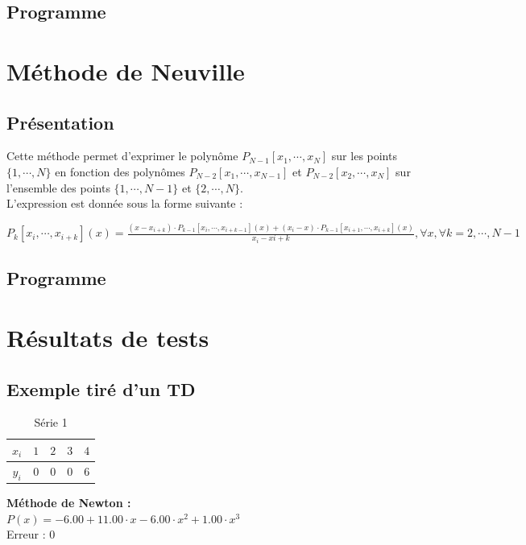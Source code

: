 \documentclass{report}
\begin{document}
      \subsection{Programme}
	
    \newpage
    \section{Méthode de Neuville}
      \subsection{Présentation}
	Cette méthode permet d'exprimer le polynôme $P_{N-1}[x_{1},\cdots,x_{N}]$ sur les points $\{1,\cdots,N\}$ en fonction des polynômes $P_{N-2}[x_{1},\cdots,x_{N-1}]$ et $P_{N-2}[x_{2},\cdots,x_{N}]$ sur l'ensemble des points $\{1,\cdots,N-1\}$ et $\{2,\cdots,N\}$.\\
	
	\noindent L'expression est donnée sous la forme suivante : 
	
	$P_{k}[x_{i},\cdots,x_{i+k}](x) = \frac{(x-x_{i+k}) \cdot P_{k-1}[x_{i},\cdots,x_{i+k-1}](x) + (x_{i}-x) \cdot P_{k-1}[x_{i+1},\cdots,x_{i+k}](x)}{x_{i}-x{i+k}}, \forall x, \forall k=2,\cdots,N-1$ 
      \subsection{Programme}
	
    \newpage
    \section{Résultats de tests}
      \subsection{Exemple tiré d'un TD}
	\begin{table}[h]
	  \centering
	  \begin{tabular}{| c | c | c | c | c |}
	  \hline 
	  $x_{i}$ & $1$ & $2$ & $3$ & $4$ \\ 
	  \hline 
	  $y_{i}$ & $0$ & $0$ & $0$ & $6$ \\ 
	  \hline 
	  \end{tabular}
	  \caption{Série 1}
	  \label{inter_td3_ex3}
	\end{table}
	
	\noindent\textbf{Méthode de Newton :}\\
	$P(x)= -6.00 + 11.00 \cdot x- 6.00 \cdot x^{2}  + 1.00 \cdot x^{3} $\\
	Erreur : $0$
	\newline
	
\end{document}
